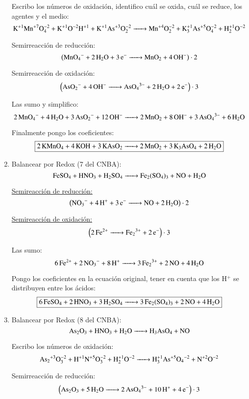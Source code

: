 \begin{enumerate}
Escribo los números de oxidación, identifico cuál se oxida, cuál se reduce, los agentes y el medio:
\[\ce{
K^{+1}Mn^{+7}O^{-2}4 + K^{+1}O^{-2}H^{+1} + K^{+1}As^{+3}O^{-2}2 ->
Mn^{+4}O^{-2}2 + K^{+1}3As^{+5}O^{-2}4 + H^{+1}2O^{-2}
}\]


\begin{multicols}{2}
Semirreacción de reducción:
$$\left(\ce{
MnO4^- + 2H2O + 3e^- ->
MnO2 + 4OH^-
}\right)\cdot 2$$

Semirreacción de oxidación:
$$\left(\ce{
AsO2^- + 4OH^- ->
AsO_4^{3-} + 2H2O + 2e^-
}\right)\cdot 3$$
\end{multicols}

Las sumo y simplifico:
$$\ce{
2MnO4^- + 4 H2O + 3AsO2^- + 12 OH^- ->
2MnO2 + 8OH^- + 3 AsO4^{3-} + 6H2O
}$$

Finalmente pongo los coeficientes:
$$\fbox{\ce{
2KMnO4 + 4KOH + 3KAsO2 ->
2MnO2 + 3K3AsO4 + 2H2O
}}$$


\newpage
\item Balancear por Redox (7 del CNBA):
$$\ce{FeSO_4 + HNO_3 + H_2SO_4 -> Fe_2(SO4)3 + NO + H2O}$$

\begin{multicols}{2}
\underline{Semireacción de reducción:}
 $$\left(\ce{NO_3^- + 4H^+ + 3e^- -> NO + 2H_2O}\right)\cdot 2$$

\underline{Semireacción de oxidación:}
$$\left(\ce{ 2Fe^{2+} -> Fe_2^{3+} + 2e^-}  \right)\cdot 3$$
\end{multicols}

Las sumo:
$$
\ce{6Fe^{2+} + 2NO_3^- + 8H^+ -> 3Fe_2^{3+} + 2NO + 4H_2O}
$$

Pongo los coeficientes en la ecuación original, tener en cuenta que los H$^+$ se distribuyen entre los ácidos:
$$\fbox{\ce{6FeSO_4 + 2HNO_3 + 3H_2SO_4 -> 3Fe_2(SO4)3 + 2NO + 4H2O}}$$


\item Balancear por Redox (8 del CNBA):
$$\ce{
As2O3 + HNO3 + H2O -> H3AsO4 + NO
}$$

Escribo los números de oxidación:
$$\ce{
As2^{+3}O^{-2}3 + H^{+1}N^{+5}O^{-2}3 + H^{+1}2O^{-2} -> H^{+1}3As^{+5}O4^{-2} + N^{+2}O^{-2}
}$$


\begin{multicols}{2}
Semirreacción de reducción:
$$\left(\ce{
As2O3 + 5H2O -> 2AsO4^{3-} + 10H^+ +4e^-
}\right)\cdot 3$$


\end{multicols}
\end{enumerate}
